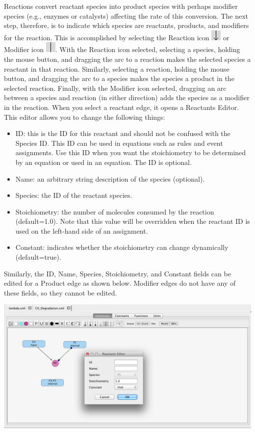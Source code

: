 \documentclass[titlepage,11pt]{article}
\begin{document}
Reactions convert reactant species into product species with perhaps modifier species (e.g., enzymes or catalysts) affecting the rate of this conversion.  The next step, therefore, is to indicate which species are reactants, products, and modifiers for the reaction.  This is accomplished by selecting the Reaction icon \includegraphics{../gui/icons/modelview/reaction_selected} or Modifier icon \includegraphics{../gui/icons/modelview/modifier_selected}.  With the Reaction icon selected, selecting a species, holding the mouse button, and dragging the arc to a reaction makes the selected species a reactant in that reaction.  Similarly, selecting a reaction, holding the mouse button, and dragging the arc to a species makes the species a product in the selected reaction.  Finally, with the Modifier icon selected, dragging an arc between a species and reaction (in either direction) adds the species as a modifier in the reaction.  When you select a reactant edge, it opens a Reactants Editor.  This editor allows you to change the following things:
\begin{itemize}
\item ID: this is the ID for this reactant and should not be confused with the Species ID.  This ID can be used in equations such as rules and event assignments.  Use this ID when you want the stoichiometry to be determined by an equation or used in an equation.  The ID is optional.
\item Name: an arbitrary string description of the species (optional).
\item Species: the ID of the reactant species.
\item Stoichiometry: the number of molecules consumed by the reaction (default=1.0).  Note that this value will be overridden when the reactant ID is used on the left-hand side of an assignment.
\item Constant: indicates whether the stoichiometry can change dynamically (default=true).  
\end{itemize}
Similarly, the ID, Name, Species, Stoichiometry, and Constant fields can be edited for a Product edge as shown below.  Modifier edges do not have any of these fields, so they cannot be edited.

\begin{center}
\includegraphics[width=155mm]{screenshots/reactant} 
\end{center}
\end{document}

